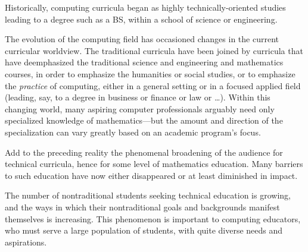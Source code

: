 Historically, computing curricula began as highly technically-oriented
studies leading to a degree such as a BS, within a school of science
or engineering.

\noindent
The evolution of the computing field has occasioned changes in the current
curricular worldview.  The traditional curricula have been joined by
curricula that have deemphasized the traditional science and
engineering and mathematics courses, in order to emphasize the
humanities or social studies,
or to
emphasize the {\em practice} of computing, either in a general setting
or in a focused applied field
(leading, say, to a degree in business or finance or law or \ldots).
Within this changing world, many aspiring computer professionals arguably
need only specialized knowledge of mathematics---but the amount and
direction of the specialization can vary greatly based on an academic
program's focus.

\medskip

Add to the preceding reality the phenomenal broadening of the audience
for technical curricula, hence for some level of mathematics
education.  Many barriers to such education have now either
disappeared or at least diminished in impact.

\medskip

The number of nontraditional students seeking technical education is
growing, and the ways in which their nontraditional goals and
backgrounds manifest themselves is increasing.  This phenomenon is
important to computing educators, who must serve a large population of
students, with quite diverse needs and aspirations.

